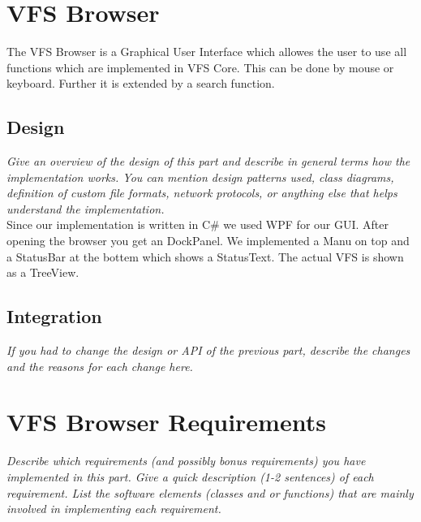 \documentclass[a4paper,12pt]{article}
\begin{document}

\section{VFS Browser}

The VFS Browser is a Graphical User Interface which allowes the user to use all functions which are implemented in VFS Core. This can be done by mouse or keyboard. Further it is extended by a search function.

\subsection{Design}

\emph{Give an overview of the design of this part and describe in general terms how the implementation works. You can mention design patterns used, class diagrams, definition of custom file formats, network protocols, or anything else that helps understand the implementation.}\\
Since our implementation is written in C\# we used WPF for our GUI. After opening the browser you get an DockPanel. We implemented a Manu on top and a StatusBar at the bottem which shows a StatusText. The actual VFS is shown as a TreeView.

\subsection{Integration}

\emph{If you had to change the design or API of the previous part, describe the changes and the reasons for each change here.}


\section{VFS Browser Requirements}

\emph{Describe which requirements (and possibly bonus requirements) you have implemented in this part. Give a quick description (1-2 sentences) of each requirement. List the software elements (classes and or functions) that are mainly involved in implementing each requirement.}
\end{document}
